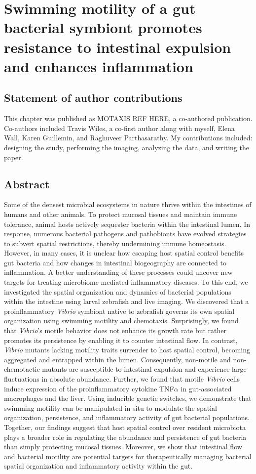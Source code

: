 \chapter{Swimming motility of a gut bacterial symbiont promotes resistance to intestinal expulsion and enhances inflammation}

\section{Statement of author contributions}
This chapter was published as MOTAXIS REF HERE, a co-authored publication. Co-authors included Travis Wiles, a co-first author along with myself, Elena Wall, Karen Guillemin, and Raghuveer Parthasarathy. My contributions included: designing the study, performing the imaging, analyzing the data, and writing the paper. 


\section{Abstract}
Some of the densest microbial ecosystems in nature thrive within the intestines of humans and other animals. To protect mucosal tissues and maintain immune tolerance, animal hosts actively sequester bacteria within the intestinal lumen. In response, numerous bacterial pathogens and pathobionts have evolved strategies to subvert spatial restrictions, thereby undermining immune homeostasis. However, in many cases, it is unclear how escaping host spatial control benefits gut bacteria and how changes in intestinal biogeography are connected to inflammation. A better understanding of these processes could uncover new targets for treating microbiome-mediated inflammatory diseases. To this end, we investigated the spatial organization and dynamics of bacterial populations within the intestine using larval zebrafish and live imaging. We discovered that a proinflammatory \textit{Vibrio} symbiont native to zebrafish governs its own spatial organization using swimming motility and chemotaxis. Surprisingly, we found that \textit{Vibrio}'s motile behavior does not enhance its growth rate but rather promotes its persistence by enabling it to counter intestinal flow. In contrast, \textit{Vibrio} mutants lacking motility traits surrender to host spatial control, becoming aggregated and entrapped within the lumen. Consequently, non-motile and non-chemotactic mutants are susceptible to intestinal expulsion and experience large fluctuations in absolute abundance. Further, we found that motile \textit{Vibrio} cells induce expression of the proinflammatory cytokine TNF$\alpha$ in gut-associated macrophages and the liver. Using inducible genetic switches, we demonstrate that swimming motility can be manipulated in situ to modulate the spatial organization, persistence, and inflammatory activity of gut bacterial populations. Together, our findings suggest that host spatial control over resident microbiota plays a broader role in regulating the abundance and persistence of gut bacteria than simply protecting mucosal tissues. Moreover, we show that intestinal flow and bacterial motility are potential targets for therapeutically managing bacterial spatial organization and inflammatory activity within the gut.

